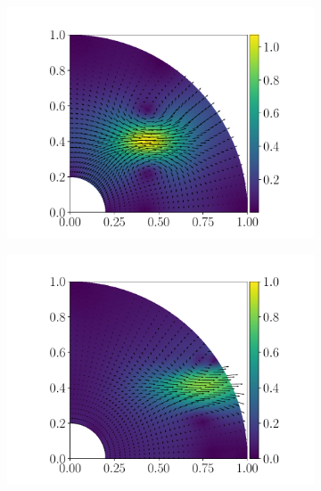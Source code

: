 \begin{figure}%
  \centering
  \begin{subfigure}{0.24\textwidth}
    \includegraphics[width=\textwidth]{images/outflow1.pdf}
  \end{subfigure}
  \begin{subfigure}{0.24\textwidth}
    \includegraphics[width=\textwidth]{images/outflow2.pdf}
  \end{subfigure}
  \begin{subfigure}{0.24\textwidth}

\end{subfigure}
\end{figure}
